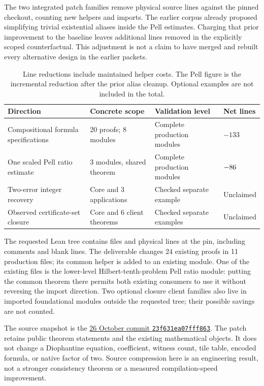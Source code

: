 \documentclass[11pt,a4paper]{article}
\newcommand{\repo}{https://github.com/VladimirReshetnikov/ProveIt}
\newcommand{\pin}{23f631ea07fff8632eb8cd92286f7621bbe051c0}
\begin{document}
The two integrated patch families remove \RawSaved{} physical source lines
against the pinned checkout, counting new helpers and imports. The earlier
corpus already proposed simplifying trivial existential aliases inside the
Pell estimates. Charging that prior improvement to the baseline leaves
\IncrementalSaved{} additional lines removed in the explicitly scoped
counterfactual. This adjustment is not a claim to have merged and rebuilt every
alternative design in the earlier packets.

\begin{table}[ht]
\centering\small
\begin{tabular}{@{}P{60mm}P{28mm}P{34mm}P{20mm}@{}}
\toprule
Direction & Concrete scope & Validation level & Net lines\\
\midrule
Compositional formula specifications & 20 proofs; 8 modules & Complete production modules & $-133$\\
One scaled Pell ratio estimate & 3 modules, shared theorem & Complete production modules & $-86$\\
Two-error integer recovery & Core and 3 applications & Checked separate example & Unclaimed\\
Observed certificate-set closure & Core and 6 client theorems & Checked separate examples & Unclaimed\\
\bottomrule
\end{tabular}
\caption{Line reductions include maintained helper costs. The Pell figure is
the incremental reduction after the prior alias cleanup. Optional examples are
not included in the total.}
\end{table}

The requested Lean tree contains \TreeFiles{} files and \TreeLines{} physical
lines at the pin, including comments and blank lines. The deliverable changes
24 existing proofs in 11 production files; its common helper is added to an
existing module. One of the existing files is the
lower-level Hilbert-tenth-problem Pell ratio module: putting the common theorem
there permits both existing consumers to use it without reversing the import
direction. Two optional closure client families also live in imported foundational
modules outside the requested tree; their possible savings are not counted.

The source snapshot is the \href{\repo/commit/\pin}{26 October commit
\texttt{23f631ea07fff863}}. The patch retains public theorem statements and the
existing mathematical objects. It does not change a Diophantine equation,
coefficient, witness count, tile table, encoded formula, or native factor of
two. Source compression here is an engineering result, not a stronger
consistency theorem or a measured compilation-speed improvement.
\end{document}
